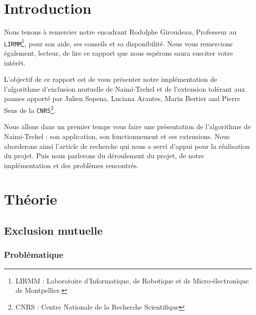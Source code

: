 \documentclass[a4paper,french,towsides,10pt]{book}
\newcommand{\clearemptydoublepage}{%
	\newpage{\pagestyle{empty}\cleardoublepage}}
\begin{document}

\renewcommand{\labelitemii}{\textasteriskcentered}

\dominitoc


\clearemptydoublepage

\tableofcontents
\clearemptydoublepage

\chapter*{Introduction}

Nous tenons à remercier notre encadrant \mbox{Rodolphe} \mbox{Giroudeau}, Professeur au \mbox{\texttt{LIRMM}}\footnote{LIRMM : Laboratoire d'Informatique, de Robotique et de Micro-électronique de Montpellier.}, pour son aide, ses conseils et sa disponibilité.
Nous vous remercions également, lecteur, de lire ce rapport que nous espérons saura susciter votre intérêt.

L’objectif de ce rapport est de vous présenter notre implémentation de l'algorithme d'exclusion mutuelle de Naimi-Trehel et de l'extension tolérant aux pannes apporté par \mbox{Julien} \mbox{Sopena}, \mbox{Luciana} \mbox{Arantes}, \mbox{Marin} \mbox{Bertier} and \mbox{Pierre} \mbox{Sens} de la \mbox{\texttt{CNRS}}\footnote{CNRS : Centre Nationale de la Recherche Scientifique}.

Nous allons dans un premier temps vous faire une présentation de l’algorithme de Naimi-Trehel : son application, son fonctionnement et ses extensions. Nous aborderons ainsi l’article de recherche qui nous a servi d’appui pour la réalisation du projet. Puis nous parlerons du déroulement du projet, de notre implémentation et des problèmes rencontrés.


\chapter{Théorie}

\section{Exclusion mutuelle}
\subsection{Problématique}

\end{document}
